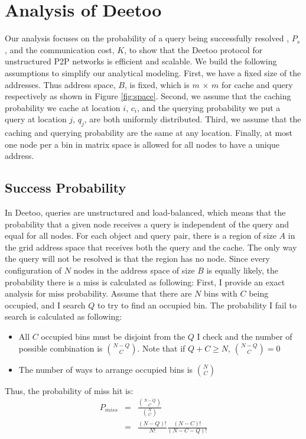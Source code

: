 \documentclass[9.5pt,journal,final,finalsubmission,twocolumn]{IEEEtran}
\begin{document}
\section{Analysis of Deetoo}\label{sec:analysis}
Our analysis focuses on the probability of a query being successfully resolved
, $P_{s}$, and the communication cost, $K$, 
to show that the Deetoo protocol for unstructured P2P
networks is efficient and scalable. We build the following assumptions to 
simplify our analytical modeling.
First, we have a fixed size of the addresses. Thus
address space, $B$, is fixed, which is $m$ $\times$
$m$ for cache and query respectively as shown in
Figure \ref{fig:space}. Second, we assume that the caching probability we
cache at location $i$, $c_{i}$, and the querying
probability we put a query at location $j$, $q_{j}$, are both
uniformly distributed. Third, we assume that the caching and querying
probability are the same at any location. Finally, at most one node per
a bin in matrix space is allowed for all nodes to have a unique
address.


\subsection{Success Probability}
\label{sec:suc_prob}
In Deetoo, queries are unstructured and load-balanced, which means that
the probability that a given node receives a query is independent of
the query and equal for all nodes.
For each object and query pair, there is a region of size $A$ in
the grid address space that receives both the query and the cache.
The only way the query will not be resolved is that the region has no
node. Since every configuration of $N$ nodes in the address space of 
size $B$ is equally likely, the probability there is a miss is 
calculated as following:
First, I provide an exact analysis for miss probability.
Assume that there are $N$ bins with $C$ being occupied, and I search $Q$
to try to find an occupied bin. The probability I fail to search is 
calculated as following:
\begin{itemize}
\item All $C$ occupied bins must be disjoint from the $Q$ I check and 
the number of possible combination is ${{N-Q}\choose{C}}$. Note that
if $Q+C\geq N$, ${{N-Q}\choose{C}}=0$
\item The number of ways to arrange occupied bins is ${{N}\choose{C}}$
\end{itemize}
Thus, the probability of miss hit is:
\begin{eqnarray}
P_{miss} &=& \frac{{{N-Q}\choose{C}}}{{{N}\choose{C}}}\\
         &=& \frac{(N-Q)!}{N!}\frac{(N-C)!}{(N-C-Q)!}
\end{eqnarray}
\end{document}
